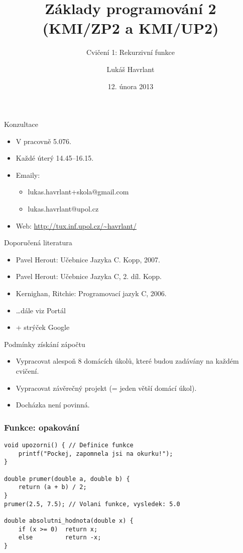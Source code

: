 \documentclass{beamer}
\title{Základy programování 2 (KMI/ZP2 a KMI/UP2)}
\subtitle{Cvičení 1: Rekurzivní funkce}
\author{Lukáš Havrlant}
\date{12. února 2013}
\institute{Univerzita Palackého}
\newenvironment{itemizex}%
  {\large \begin{itemize}%
    \setlength{\itemsep}{8pt}%
    \setlength{\parskip}{8pt}}%
  {\end{itemize}}
\begin{document}
\begin{frame}[t,plain]
\titlepage
\end{frame}


\begin{frame}[t,fragile]{Konzultace}
\begin{itemizex}
\item V pracovně 5.076.
\item Každé úterý 14.45--16.15. 
\item Emaily:
  \begin{itemizex}
    \item lukas.havrlant+skola@gmail.com
    \item lukas.havrlant@upol.cz
  \end{itemizex}
\item Web: \url{http://tux.inf.upol.cz/~havrlant/}
\end{itemizex}
\end{frame}


\begin{frame}[t,fragile]{Doporučená literatura}
\begin{itemize}
\item Pavel Herout: Učebnice Jazyka C. Kopp, 2007.
\item Pavel Herout: Učebnice Jazyka C, 2. díl. Kopp.
\item Kernighan, Ritchie: Programovací jazyk C, 2006.
\item \dots dále viz Portál
\item + strýček Google
\end{itemize}
\end{frame}

\begin{frame}[t,fragile]{Podmínky získání zápočtu}
\begin{itemizex}
  \item Vypracovat alespoň 8 domácích úkolů, které budou zadávány na každém cvičení. 
  \item Vypracovat závěrečný projekt (= jeden větší domácí úkol). 
  \item Docházka není povinná.
\end{itemizex}
\end{frame}

\begin{frame}[t,fragile]\frametitle{Funkce: opakování} 
\begin{verbatim} 
void upozorni() { // Definice funkce
    printf("Pockej, zapomnela jsi na okurku!");
}

double prumer(double a, double b) {
    return (a + b) / 2;
}
prumer(2.5, 7.5); // Volani funkce, vysledek: 5.0

double absolutni_hodnota(double x) {
    if (x >= 0)  return x;
    else         return -x;
}
\end{verbatim}
\end{frame}
\end{document}

